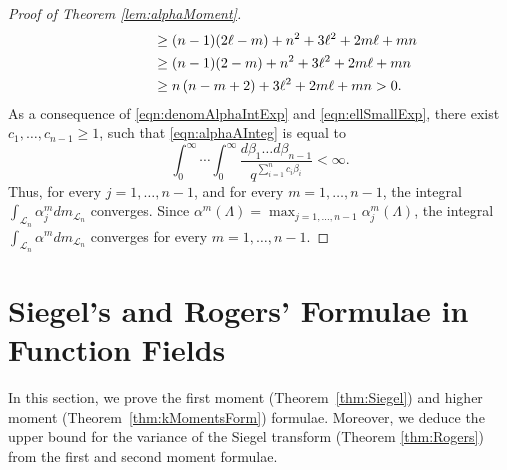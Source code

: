 \documentclass[11pt,a4paper,reqno]{amsart}
\theoremstyle{definition}
\theoremstyle{remark}
\numberwithin{equation}{section}
\begin{document}
\begin{proof}[Proof of Theorem \ref{lem:alphaMoment}]
\begin{equation}
\begin{split}
    &\hspace{0.5in}\geq (n-1)(2\ell-m)+n^2+3\ell^2+2m\ell+mn\\
    &\hspace{0.5in}\geq (n-1)(2-m)+n^2+3\ell^2+2m\ell+mn\\
    &\hspace{0.5in}\geq n\left(n-m+2\right)+3\ell^2+2m\ell+mn>0.
    \end{split}\end{equation}
    As a consequence of \eqref{eqn:denomAlphaIntExp} and \eqref{eqn:ellSmallExp}, there exist $c_1,\dots,c_{n-1}\geq 1$, such that \eqref{eqn:alphaAInteg} is equal to 
    \begin{equation}
        \int_0^{\infty}\cdots \int_0^{\infty}\frac{d\beta_1\dots d\beta_{n-1}}{q^{\sum_{i=1}^n c_i\beta_i}}<\infty.
    \end{equation}
Thus, for every $j=1,\dots,n-1$, and for every $m=1,\dots, n-1$, the integral $\int_{\mathcal{L}_n}\alpha_j^mdm_{\mathcal{L}_n}$ converges. Since $\alpha^m(\Lambda)=\max_{j=1,\dots,n-1}\alpha_j^m(\Lambda)$, the integral $\int_{\mathcal{L}_n}\alpha^mdm_{\mathcal{L}_n}$ converges for every $m=1,\dots,n-1$.
\end{proof}

\section{Siegel's and Rogers' Formulae in Function Fields}
\label{sec:SiegelRogers}
In this section, we prove the first moment (Theorem~\ref{thm:Siegel}) and higher moment (Theorem~\ref{thm:kMomentsForm}) formulae. Moreover, we deduce the upper bound for the variance of the Siegel transform (Theorem \ref{thm:Rogers}) from the first and second moment formulae. 
\end{document}
